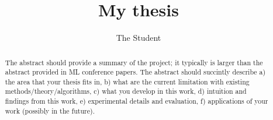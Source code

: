 \documentclass[a4paper,11pt,oneside]{mythesis}
\title{My thesis}
\author{The Student}
\begin{document}
\frontmatter
{}
\titlepage


\begin{abstract}
The abstract should provide a summary of the project; it typically is larger than the abstract provided in ML conference papers. The abstract should succintly describe a) the area that your thesis fits in, b) what are the current limitation with existing methods/theory/algorithms, c) what you develop in this work, d) intuition and findings from this work, e) experimental details and evaluation, f) applications of your work (possibly in the future). 
\end{abstract}
\clearpage

 \clearpage
\tableofcontents* \clearpage

\mainmatter
\pagestyle{TUDelft}
\clearpage
\clearpage
\clearpage
\clearpage
\clearpage

\cleardoublepage


\end{document}
